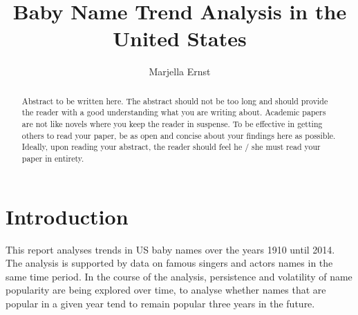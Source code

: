 \documentclass[11pt,preprint]{elsarticle}
\numberwithin{equation}{section}
\numberwithin{figure}{section}
\numberwithin{table}{section}
\begin{document}
\begin{frontmatter}  %

\title{Baby Name Trend Analysis in the United States}





\author[Add1]{Marjella Ernst}





\address[Add1]{Stellenbosch University, Stellenbosch, South Africa}


\begin{abstract}
\small{
Abstract to be written here. The abstract should not be too long and
should provide the reader with a good understanding what you are writing
about. Academic papers are not like novels where you keep the reader in
suspense. To be effective in getting others to read your paper, be as
open and concise about your findings here as possible. Ideally, upon
reading your abstract, the reader should feel he / she must read your
paper in entirety.
}
\end{abstract}

\vspace{1cm}





\vspace{0.5cm}

\end{frontmatter}

\setcounter{footnote}{0}



\pagestyle{fancy}
\chead{}
\rhead{}
\lfoot{}
\lhead{}
\cfoot{}


\headsep 35pt %




\section{\texorpdfstring{Introduction
\label{Introduction}}{Introduction }}\label{introduction}

This report analyses trends in US baby names over the years 1910 until
2014. The analysis is supported by data on famous singers and actors
names in the same time period. In the course of the analysis,
persistence and volatility of name popularity are being explored over
time, to analyse whether names that are popular in a given year tend to
remain popular three years in the future.
\end{document}
